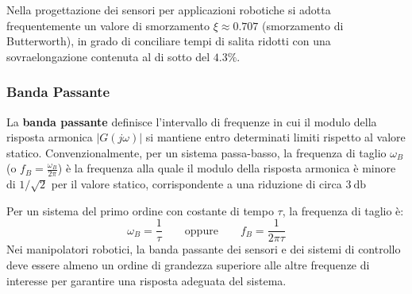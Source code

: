 ﻿\documentclass[11pt, a4paper]{article}
\begin{document}
\begin{itemize}
\begin{figure}[H]
\end{figure}

Nella progettazione dei sensori per applicazioni robotiche si adotta frequentemente un valore di smorzamento $\xi \approx 0.707$ (smorzamento di Butterworth), in grado di conciliare tempi di salita ridotti con una sovraelongazione contenuta al di sotto del $4.3\%$.
\end{itemize}

\subsubsection{Banda Passante}
La \textbf{banda passante} definisce l'intervallo di frequenze in cui il modulo della risposta armonica $|G(j\omega)|$ si mantiene entro determinati limiti rispetto al valore statico. Convenzionalmente, per un sistema passa-basso, la frequenza di taglio $\omega_B$ (o $f_B = \frac{\omega_B}{2\pi}$) è la frequenza alla quale il modulo della risposta armonica è minore di $1/\sqrt{2}$ per il valore statico, corrispondente a una riduzione di circa $\SI{3}{\decibel}$

Per un sistema del primo ordine con costante di tempo $\tau$, la frequenza di taglio è:
\[
    \omega_B = \frac{1}{\tau}
    \qquad \text{oppure} \qquad
    f_B = \frac{1}{2\pi\tau}
\]
Nei manipolatori robotici, la banda passante dei sensori e dei sistemi di controllo deve essere almeno un ordine di grandezza superiore alle altre frequenze di interesse per garantire una risposta adeguata del sistema.

\newpage
\end{document}
